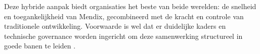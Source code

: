 Deze hybride aanpak biedt organisaties het beste van beide werelden: de snelheid en toegankelijkheid van Mendix, gecombineerd met de kracht en controle van traditionele ontwikkeling. Voorwaarde is wel dat er duidelijke kaders en technische governance worden ingericht om deze samenwerking structureel in goede banen te leiden \autocite{Balla2024}.



